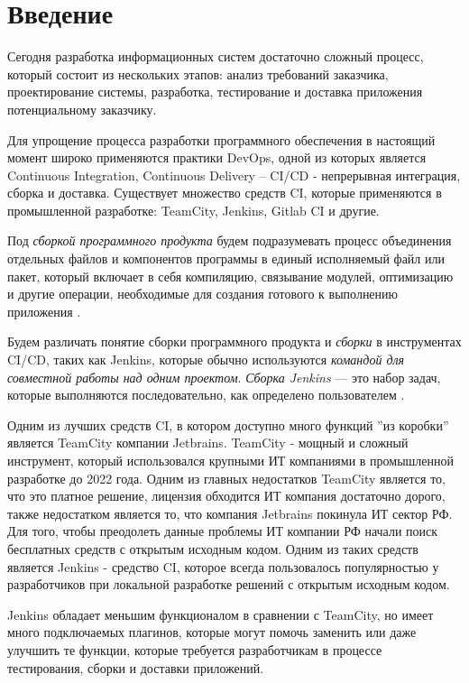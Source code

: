 \chapter*{Введение} %

Сегодня разработка информационных систем достаточно сложный процесс, который состоит из нескольких этапов: анализ требований заказчика, проектирование системы, разработка, тестирование и доставка приложения потенциальному заказчику. 

Для упрощение процесса разработки программного обеспечения в настоящий момент широко применяются практики DevOps, одной из которых является Continuous Integration, Continuous Delivery -- CI/CD - непрерывная интеграция, сборка и доставка. Существует множество средств CI, которые применяются в промышленной разработке: TeamCity, Jenkins, Gitlab CI и другие.

Под \textit{сборкой программного продукта} будем подразумевать процесс объединения отдельных файлов и компонентов программы в единый исполняемый файл или пакет, который включает в себя компиляцию, связывание модулей, оптимизацию и другие операции, необходимые для создания готового к выполнению приложения \cite{build}.

Будем различать понятие сборки программного продукта и \textit{сборки} в инструментах CI/CD, таких как Jenkins, которые обычно используются \textit{командой для совместной работы над одним проектом}. \textit{Сборка Jenkins} — это набор задач, которые выполняются последовательно, как определено пользователем \cite{jenkinsjob}.

Одним из лучших средств CI, в котором доступно много функций ''из коробки'' является TeamCity компании Jetbrains. TeamCity - мощный и сложный инструмент, который использовался крупными ИТ компаниями в промышленной разработке до 2022 года. Одним из главных недостатков TeamCity является то, что это платное решение, лицензия обходится ИТ компания достаточно дорого, также недостатком является то, что компания Jetbrains покинула ИТ сектор РФ. Для того, чтобы преодолеть данные проблемы ИТ компании РФ начали поиск бесплатных средств с открытым исходным кодом. Одним из таких средств является Jenkins - средство CI, которое всегда пользовалось популярностью у разработчиков при локальной разработке решений с открытым исходным кодом. 

Jenkins обладает меньшим функционалом в сравнении с TeamCity, но имеет много подключаемых плагинов, которые могут помочь заменить или даже улучшить те функции, которые требуется разработчикам в процессе тестирования, сборки и доставки приложений.

